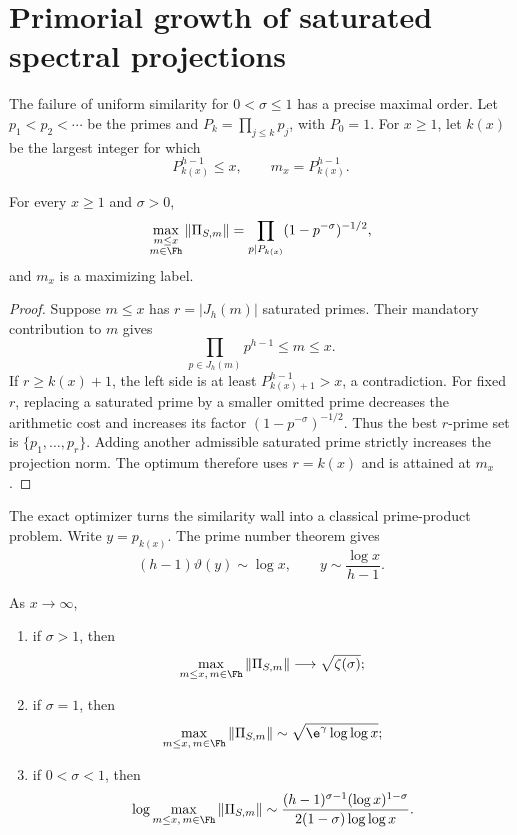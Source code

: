 \section{Primorial growth of saturated spectral projections}
\label{sec:primorial}

The failure of uniform similarity for $0<\sigma\le1$ has a precise
maximal order.  Let $p_1<p_2<\cdots$ be the primes and
$P_k=\prod_{j\le k}p_j$, with $P_0=1$.  For $x\ge1$, let $k(x)$ be the
largest integer for which
\begin{equation}
  P_{k(x)}^{h-1}\le x,
  \qquad m_x=P_{k(x)}^{h-1}.
  \label{eq:primorial-index}
\end{equation}

\begin{proposition}
\label{prop:primorial-optimizer}
For every $x\ge1$ and $\sigma>0$,
\begin{equation}
  \max_{\substack{m\le x\\m\in\Fh}}\|\Pi_{S,m}\|
  =\prod_{p\mid P_{k(x)}}(1-p^{-\sigma})^{-1/2},
  \label{eq:exact-primorial-max}
\end{equation}
and $m_x$ is a maximizing label.
\end{proposition}

\begin{proof}
Suppose $m\le x$ has $r=|J_h(m)|$ saturated primes.  Their mandatory
contribution to $m$ gives
\[
  \prod_{p\in J_h(m)}p^{h-1}\le m\le x.
\]
If $r\ge k(x)+1$, the left side is at least
$P_{k(x)+1}^{h-1}>x$, a contradiction.  For fixed $r$, replacing a
saturated prime by a smaller omitted prime decreases the arithmetic cost and
increases its factor $(1-p^{-\sigma})^{-1/2}$.  Thus the best $r$-prime
set is $\{p_1,\ldots,p_r\}$.  Adding another admissible saturated prime
strictly increases the projection norm.  The optimum therefore uses
$r=k(x)$ and is attained at $m_x$.
\end{proof}

The exact optimizer turns the similarity wall into a classical prime-product
problem.  Write $y=p_{k(x)}$.  The prime number theorem gives
\begin{equation}
  (h-1)\vartheta(y)\sim\log x,
  \qquad
  y\sim\frac{\log x}{h-1}.
  \label{eq:y-asymptotic}
\end{equation}

\begin{theorem}
\label{thm:three-regimes}
As $x\to\infty$,
\begin{enumerate}[label=\textup{(\alph*)}]
  \item if $\sigma>1$, then
  \[
    \max_{m\le x,\,m\in\Fh}\|\Pi_{S,m}\|
      \longrightarrow\sqrt{\zeta(\sigma)};
  \]
  \item if $\sigma=1$, then
  \[
    \max_{m\le x,\,m\in\Fh}\|\Pi_{S,m}\|
      \sim\sqrt{\e^\gamma\log\log x};
  \]
  \item if $0<\sigma<1$, then
  \[
    \log\max_{m\le x,\,m\in\Fh}\|\Pi_{S,m}\|
      \sim
      \frac{(h-1)^{\sigma-1}(\log x)^{1-\sigma}}
           {2(1-\sigma)\log\log x}.
  \]
\end{enumerate}
\end{theorem}


